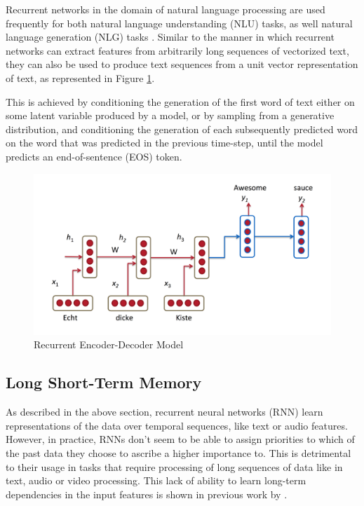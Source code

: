 Recurrent networks in the domain of natural language processing are used frequently for both natural language understanding (NLU) tasks, as well natural language generation (NLG) tasks \citep{bengio2003neural,morin2005hierarchical,mikolov2010recurrent}. Similar to the manner in which recurrent networks can extract features from arbitrarily long sequences of vectorized text, they can also be used to produce text sequences from a unit vector representation of text, as represented in Figure \ref{fig:rnn-nmt}.

This is achieved by conditioning the generation of the first word of text either on some latent variable produced by a model, or by sampling from a generative distribution, and conditioning the generation of each subsequently predicted word on the word that was predicted in the previous time-step, until the model predicts an end-of-sentence (EOS) token.

\begin{figure}[ht]
	\centering
	\includegraphics[width=\textwidth]{images/rnn-nmt}
	\caption{\label{fig:rnn-nmt} Recurrent Encoder-Decoder Model}
\end{figure}


\subsection{Long Short-Term Memory}

As described in the above section, recurrent neural networks (RNN) learn representations of the data over temporal sequences, like text or audio features. However, in practice, RNNs don't seem to be able to assign priorities to which of the past data they choose to ascribe a higher importance to. This is detrimental to their usage in tasks that require processing of long sequences of data like in text, audio or video processing. This lack of ability to learn long-term dependencies in the input features is shown in previous work by \cite{bengio1994learning}.

